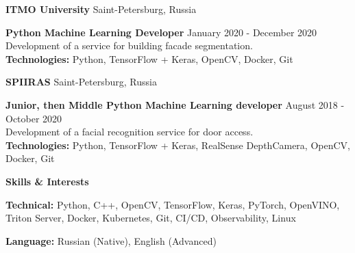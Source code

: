 \documentclass[11pt]{article}
\begin{document}
\vspace{12pt}

\textbf{ITMO University} \hfill Saint-Petersburg, Russia

\textbf{Python Machine Learning Developer} \hfill January 2020 - December 2020 \\[2ex]
Development of a service for building facade segmentation. \\
\textbf{Technologies:} Python, TensorFlow + Keras, OpenCV, Docker, Git

\vspace{12pt}

\textbf{SPIIRAS} \hfill Saint-Petersburg, Russia

\textbf{Junior, then Middle Python Machine Learning developer} \hfill August 2018 - October 2020 \\[2ex]
Development of a facial recognition service for door access. \\
\textbf{Technologies:} Python, TensorFlow + Keras, RealSense DepthCamera, OpenCV, Docker, Git

\vspace{12pt}

\begin{center}
    \textbf{Skills \& Interests}
\end{center}

\textbf{Technical:} Python, C++, OpenCV, TensorFlow, Keras, PyTorch, OpenVINO, Triton Server, Docker, Kubernetes, Git, CI/CD, Observability, Linux

\textbf{Language:} Russian (Native), English (Advanced)

\end{document}
